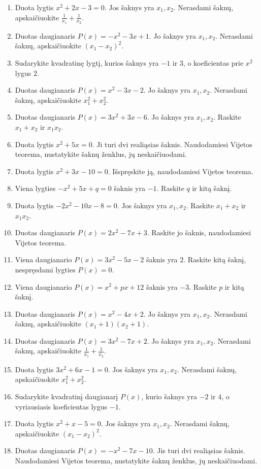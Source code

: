 \documentclass[11pt,a4paper]{article}
\begin{document}
\begin{enumerate}
\item Duota lygtis \(x^2+2x-3=0\). Jos šaknys yra \(x_1,x_2\). Nerasdami šaknų, apskaičiuokite \mbox{\(\frac1{x_1}+\frac1{x_2}\)}.
\item Duotas daugianaris \(P(x)=-x^2-3x+1\). Jo šaknys yra \(x_1,x_2\). Nerasdami šaknų, apskaičiuokite \mbox{\((x_1-x_2)^2\)}.
\item Sudarykite kvadratinę lygtį, kurios šaknys yra \(-1\) ir \(3\), o koeficientas prie \(x^2\) lygus \(2\).
\item Duotas daugianaris \(P(x)=x^2-3x-2\). Jo šaknys yra \(x_1,x_2\). Nerasdami šaknų, apskaičiuokite \mbox{\(x_1^2+x_2^2\)}.
\item Duotas daugianaris \(P(x)=3x^2+3x-6\). Jo šaknys yra \(x_1,x_2\). Raskite \(x_1+x_2\) ir \(x_1x_2\).
\item Duota lygtis \(x^2+5x=0\). Ji turi dvi realiąsias šaknis. Naudodamiesi Vijetos teorema, nustatykite šaknų ženklus, jų neskaičiuodami.
\item Duota lygtis \(x^2+3x-10=0\). Išspręskite ją, naudodamiesi Vijetos teorema.
\item Viena lygties \(-x^2+5x+q=0\) šaknis yra \(-1\). Raskite \(q\) ir kitą šaknį.
\item Duota lygtis \(-2x^2-10x-8=0\). Jos šaknys yra \(x_1,x_2\). Raskite \(x_1+x_2\) ir \(x_1x_2\).
\item Duotas daugianaris \(P(x)=2x^2-7x+3\). Raskite jo šaknis, naudodamiesi Vijetos teorema.
\item Viena daugianario \(P(x)=3x^2-5x-2\) šaknis yra \(2\). Raskite kitą šaknį, nespręsdami lygties \(P(x)=0\).
\item Viena daugianario \(P(x)=x^2+px+12\) šaknis yra \(-3\). Raskite \(p\) ir kitą šaknį.
\item Duotas daugianaris \(P(x)=x^2-4x+2\). Jo šaknys yra \(x_1,x_2\). Nerasdami šaknų, apskaičiuokite \mbox{\((x_1+1)(x_2+1)\)}.
\item Duotas daugianaris \(P(x)=3x^2-7x+2\). Jo šaknys yra \(x_1,x_2\). Nerasdami šaknų, apskaičiuokite \mbox{\(\frac1{x_1}+\frac1{x_2}\)}.
\item Duota lygtis \(3x^2+6x-1=0\). Jos šaknys yra \(x_1,x_2\). Nerasdami šaknų, apskaičiuokite \mbox{\(x_1^2+x_2^2\)}.
\item Sudarykite kvadratinį daugianarį \(P(x)\), kurio šaknys yra \(-2\) ir \(4\), o vyriausiasis koeficientas lygus \(-1\).
\item Duota lygtis \(x^2+x-5=0\). Jos šaknys yra \(x_1,x_2\). Nerasdami šaknų, apskaičiuokite \mbox{\((x_1-x_2)^2\)}.
\item Duotas daugianaris \(P(x)=-x^2-7x-10\). Jis turi dvi realiąsias šaknis. Naudodamiesi Vijetos teorema, nustatykite šaknų ženklus, jų neskaičiuodami.
\end{enumerate}
\clearpage
\end{document}
